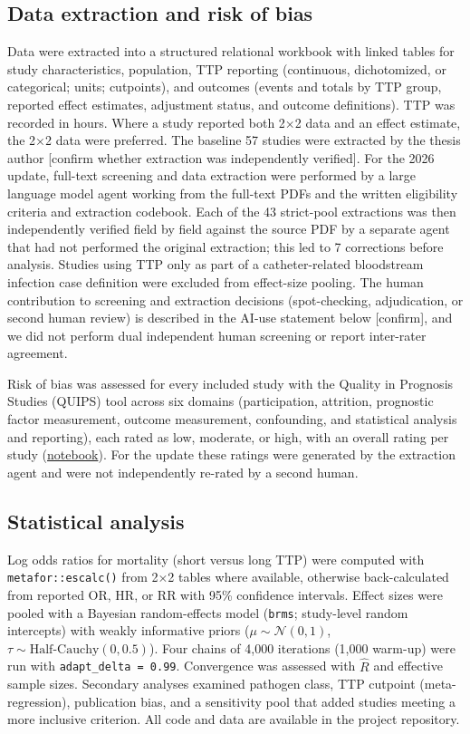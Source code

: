 \documentclass[
  11pt,
]{article}
\begin{document}
\subsection{Data extraction and risk of
bias}\label{data-extraction-and-risk-of-bias}

Data were extracted into a structured relational workbook with linked
tables for study characteristics, population, TTP reporting (continuous,
dichotomized, or categorical; units; cutpoints), and outcomes (events
and totals by TTP group, reported effect estimates, adjustment status,
and outcome definitions). TTP was recorded in hours. Where a study
reported both 2×2 data and an effect estimate, the 2×2 data were
preferred. The baseline 57 studies were extracted by the thesis author
{[}confirm whether extraction was independently verified{]}. For the
2026 update, full-text screening and data extraction were performed by a
large language model agent working from the full-text PDFs and the
written eligibility criteria and extraction codebook. Each of the 43
strict-pool extractions was then independently verified field by field
against the source PDF by a separate agent that had not performed the
original extraction; this led to 7 corrections before analysis. Studies
using TTP only as part of a catheter-related bloodstream infection case
definition were excluded from effect-size pooling. The human
contribution to screening and extraction decisions (spot-checking,
adjudication, or second human review) is described in the AI-use
statement below {[}confirm{]}, and we did not perform dual independent
human screening or report inter-rater agreement.

Risk of bias was assessed for every included study with the Quality in
Prognosis Studies (QUIPS) tool across six domains (participation,
attrition, prognostic factor measurement, outcome measurement,
confounding, and statistical analysis and reporting), each rated as low,
moderate, or high, with an overall rating per study
(\href{notebooks/rob.qmd}{notebook}). For the update these ratings were
generated by the extraction agent and were not independently re-rated by
a second human.

\subsection{Statistical analysis}\label{statistical-analysis}

Log odds ratios for mortality (short versus long TTP) were computed with
\texttt{metafor::escalc()} from 2×2 tables where available, otherwise
back-calculated from reported OR, HR, or RR with 95\% confidence
intervals. Effect sizes were pooled with a Bayesian random-effects model
(\texttt{brms}; study-level random intercepts) with weakly informative
priors (\(\mu \sim \mathcal{N}(0,1)\),
\(\tau \sim \text{Half-Cauchy}(0, 0.5)\)). Four chains of 4,000
iterations (1,000 warm-up) were run with \texttt{adapt\_delta\ =\ 0.99}.
Convergence was assessed with \(\hat{R}\) and effective sample sizes.
Secondary analyses examined pathogen class, TTP cutpoint
(meta-regression), publication bias, and a sensitivity pool that added
studies meeting a more inclusive criterion. All code and data are
available in the project repository.
\end{document}
